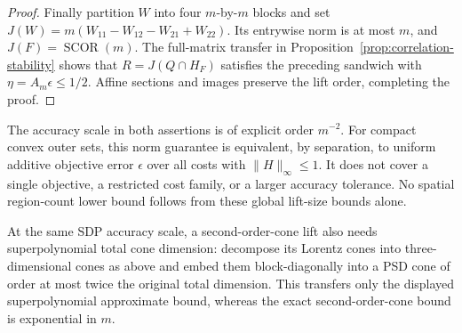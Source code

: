 \begin{proof}
Finally partition $W$ into four $m$-by-$m$ blocks and set
$J(W)=m(W_{11}-W_{12}-W_{21}+W_{22})$.
Its entrywise norm is at most $m$, and $J(F)=\operatorname{SCOR}(m)$.
The full-matrix transfer in Proposition~\ref{prop:correlation-stability}
shows that $R=J(Q\cap H_F)$ satisfies the preceding sandwich with
$\eta=A_m\epsilon\le1/2$. Affine sections and images preserve the lift
order, completing the proof.
\end{proof}
The accuracy scale in both assertions is of explicit order $m^{-2}$. For
compact convex outer sets, this norm guarantee is equivalent, by
separation, to uniform additive objective error $\epsilon$ over all costs
with $\|H\|_\infty\le1$. It does not cover a single objective, a
restricted cost family, or a larger accuracy tolerance. No spatial
region-count lower bound follows from these global lift-size bounds
alone.

At the same SDP accuracy scale, a second-order-cone lift also needs
superpolynomial total cone dimension: decompose its Lorentz cones into
three-dimensional cones as above and embed them block-diagonally into
a PSD cone of order at most twice the original total dimension. This
transfers only the displayed superpolynomial approximate bound, whereas
the exact second-order-cone bound is exponential in $m$.
